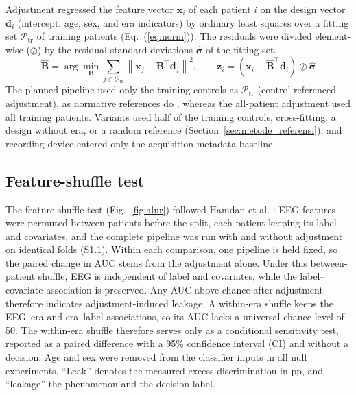 \documentclass[final,1p,times]{elsarticle}
\newcommand{\figref}[1]{Fig.~\ref{#1}}
\renewcommand{\eqref}[1]{Eq.~(\ref{#1})}
\begin{document}
\label{sec:model}Adjustment regressed the feature vector $\mathbf{x}_i$ of each patient $i$ on the design vector $\mathbf{d}_i$ (intercept, age, sex, and era indicators) by ordinary least squares over a fitting set $\mathcal{P}_{\mathrm{tr}}$ of training patients (\eqref{eq:norm}). The residuals were divided element-wise ($\oslash$) by the residual standard deviations $\hat{\boldsymbol{\sigma}}$ of the fitting set.
\begin{equation}\label{eq:norm}
\hat{\mathbf{B}}=\arg\min_{\mathbf{B}}\sum_{j\in\mathcal{P}_{\mathrm{tr}}}\left\|\mathbf{x}_j-\mathbf{B}^{\top}\mathbf{d}_j\right\|^{2},\qquad
\mathbf{z}_i=\left(\mathbf{x}_i-\hat{\mathbf{B}}^{\top}\mathbf{d}_i\right)\oslash\hat{\boldsymbol{\sigma}}
\end{equation}
The planned pipeline used only the training controls as $\mathcal{P}_{\mathrm{tr}}$ (control-referenced adjustment), as normative references do \cite{rutherford2022,rutherford2023}, whereas the all-patient adjustment used all training patients. Variants used half of the training controls, cross-fitting, a design without era, or a random reference (Section~\ref{sec:metode_referensi}), and recording device entered only the acquisition-metadata baseline.

\subsection{Feature-shuffle test}\label{sec:uji_acak}

The feature-shuffle test (\figref{fig:alur}) followed Hamdan et al. \cite{hamdan2023}: EEG features were permuted between patients before the split, each patient keeping its label and covariates, and the complete pipeline was run with and without adjustment on identical folds (S1.1). Within each comparison, one pipeline is held fixed, so the paired change in AUC stems from the adjustment alone. Under this between-patient shuffle, EEG is independent of label and covariates, while the label--covariate association is preserved. Any AUC above chance after adjustment therefore indicates adjustment-induced leakage. A within-era shuffle keeps the EEG--era and era--label associations, so its AUC lacks a universal chance level of 50. The within-era shuffle therefore serves only as a conditional sensitivity test, reported as a paired difference with a 95\% confidence interval (CI) and without a decision. Age and sex were removed from the classifier inputs in all null experiments. ``Leak'' denotes the measured excess discrimination in pp, and ``leakage'' the phenomenon and the decision label.
\end{document}
